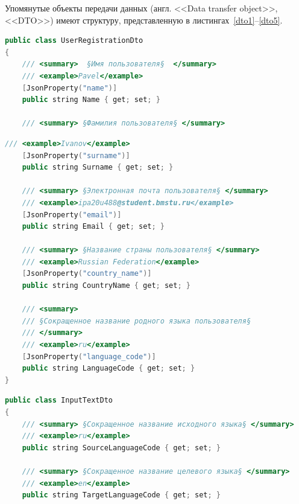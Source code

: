 Упомянутые объекты передачи данных (англ. <<Data transfer object>>,\\ <<DTO>>) имеют структуру, представленную в листингах~\ref{dto1}--\ref{dto5}.

\captionsetup{singlelinecheck = false, justification=raggedright}
\begin{lstlisting}[caption={UserRegistrationDto}, language=c++, label=dto1]
public class UserRegistrationDto
{
	/// <summary>  §Имя пользователя§  </summary>
	/// <example>Pavel</example>
	[JsonProperty("name")]
	public string Name { get; set; }
	
	/// <summary> §Фамилия пользователя§ </summary>
\end{lstlisting}

\begin{lstlisting}[title={Окончание листинга \ref{dto1}}, language=c++, label=dto11, firstnumber=9]
	/// <example>Ivanov</example>
	[JsonProperty("surname")]
	public string Surname { get; set; }
	
	/// <summary> §Электронная почта пользователя§ </summary>
	/// <example>ipa20u488@student.bmstu.ru</example>
	[JsonProperty("email")]
	public string Email { get; set; }
	
	/// <summary> §Название страны пользователя§ </summary>
	/// <example>Russian Federation</example>
	[JsonProperty("country_name")]
	public string CountryName { get; set; }
	
	/// <summary>
	/// §Сокращенное название родного языка пользователя§
	/// </summary>
	/// <example>ru</example>
	[JsonProperty("language_code")]
	public string LanguageCode { get; set; }
}
\end{lstlisting}

\begin{lstlisting}[caption={InputTextDto}, language=c++, label=dto2]
public class InputTextDto
{
	/// <summary> §Сокращенное название исходного языка§ </summary>
	/// <example>ru</example>
	public string SourceLanguageCode { get; set; }
	
	/// <summary> §Сокращенное название целевого языка§ </summary>
	/// <example>en</example>
	public string TargetLanguageCode { get; set; }
\end{lstlisting}

